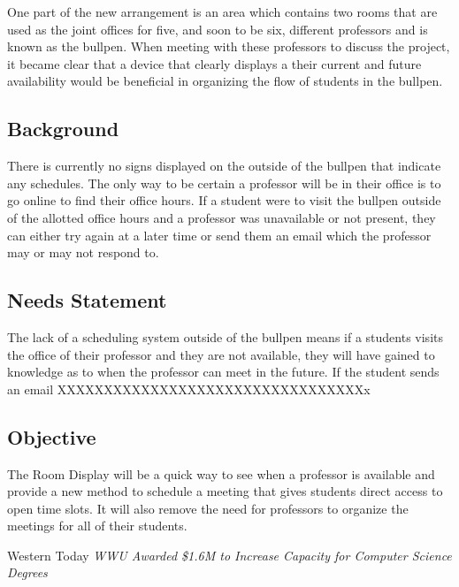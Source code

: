 \documentclass[dvips,12pt]{article}
\begin{document}
One part of the new arrangement is an area which contains two rooms that are used as the joint offices for five, and soon to be six, different professors and is known as the bullpen. When meeting with these professors to discuss the project, it became clear that a device that clearly displays a their current and future availability would be beneficial in organizing the flow of students in the bullpen.

\subsection{Background}

There is currently no signs displayed on the outside of the bullpen that indicate any schedules. The only way to be certain a professor will be in their office is to go online to find their office hours. If a student were to visit the bullpen outside of the allotted office hours and a professor was unavailable or not present, they can either try again at a later time or send them an email which the professor may or may not respond to.

\subsection{Needs Statement}
The lack of a scheduling system outside of the bullpen means if a students visits the office of their professor and they are not available, they will have gained to knowledge as to when the professor can meet in the future. If the student sends an email XXXXXXXXXXXXXXXXXXXXXXXXXXXXXXXXXx

\subsection{Objective}

The Room Display will be a quick way to see when a professor is available and provide a new method to schedule a meeting that gives students direct access to open time slots. It will also remove the need for professors to organize the meetings for all of their students.

\newpage

\begin{thebibliography}{99}
Western Today 
\textit{WWU Awarded \$1.6M to Increase Capacity for Computer Science Degrees}
\end{thebibliography}
\end{document}
